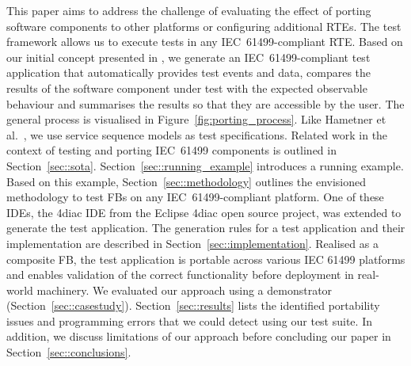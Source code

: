 This paper aims to address the challenge of evaluating the effect of porting software components to other platforms or configuring additional RTEs. The test framework allows us to execute tests in any IEC~61499-compliant RTE. Based on our initial concept presented in \cite{biancaMidhunETFAwip}, we generate an IEC~61499-compliant test application that automatically provides test events and data, compares the results of the software component under test with the expected observable behaviour and summarises the results so that they are accessible by the user. The general process is visualised in Figure~\ref{fig:porting_process}. 
Like Hametner et al.~\cite{hametner2014}, we use service sequence models as test specifications. Related work in the context of testing and porting IEC~61499 components is outlined in Section~\ref{sec::sota}. Section~\ref{sec::running_example} introduces a running example. Based on this example, Section~\ref{sec::methodology} outlines the envisioned methodology to test FBs on any IEC~61499-compliant platform. 
One of these IDEs, the 4diac IDE from the Eclipse 4diac open source project, was extended to generate the test application. 
The generation rules for a test application and their implementation are described in Section~\ref{sec::implementation}. Realised as a composite FB, the test application is portable across various IEC 61499 platforms and enables validation of the correct functionality before deployment in real-world machinery. We evaluated our approach using a demonstrator (Section~\ref{sec::casestudy}). Section~\ref{sec::results} lists the identified portability issues and programming errors that we could detect using our test suite. In addition, we discuss limitations of our approach before concluding our paper in Section~\ref{sec::conclusions}. 


